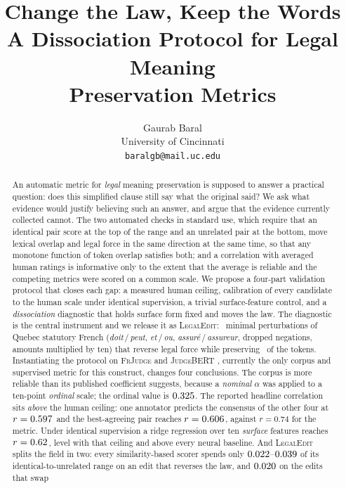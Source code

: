 \documentclass[11pt]{article}
\title{\textbf{Change the Law, Keep the Words}\\[2pt]
\large A Dissociation Protocol for Legal Meaning\\
Preservation Metrics}
\author{Gaurab Baral\\[2pt]
\normalsize University of Cincinnati\\[1pt]
\normalsize \texttt{baralgb@mail.uc.edu}}
\date{}
\begin{document}
\maketitle

\begin{abstract}
\noindent
An automatic metric for \emph{legal} meaning preservation is supposed to answer
a practical question: does this simplified clause still say what the original
said? We ask what evidence would justify believing such an answer, and argue
that the evidence currently collected cannot. The two automated checks in
standard use, which require that an identical pair score at the top of the
range and an unrelated pair at the bottom, move lexical overlap and legal force
in the same direction at the same time, so that any monotone function of token
overlap satisfies both; and a correlation with averaged human ratings is
informative only to the extent that the average is reliable and the competing
metrics were scored on a common scale. We propose a four-part validation protocol that closes each
gap: a measured human ceiling, calibration of every candidate to the human scale
under identical supervision, a trivial surface-feature control, and a
\emph{dissociation} diagnostic that holds surface form fixed and moves the law.
The diagnostic is the central instrument and we release it as
\textsc{LegalEdit}: \numedits\ minimal perturbations of Quebec statutory French
(\emph{doit}\,/\,\emph{peut}, \emph{et}\,/\,\emph{ou},
\emph{assur\'e}\,/\,\emph{assureur}, dropped negations, amounts multiplied by
ten) that reverse legal force while preserving \meanjaccard\ of the tokens.
Instantiating the protocol on \textsc{FrJudge} and \textsc{JudgeBERT}
\citep{beauchemin2025judgebert}, currently the only corpus and supervised metric
for this construct, changes four conclusions. The corpus is more reliable than
its published coefficient suggests, because a \emph{nominal} $\alpha$ was
applied to a ten-point \emph{ordinal} scale; the ordinal value is $0.325$.
The reported headline correlation sits \emph{above} the human ceiling: one
annotator predicts the consensus of the other four at $r=0.597$ and the
best-agreeing pair reaches $r=0.606$, against $r=0.74$ for the metric.
Under identical supervision a ridge regression over ten \emph{surface} features
reaches $r=0.62$, level with that ceiling and above every neural baseline.
And \textsc{LegalEdit} splits the field in two: every similarity-based scorer
spends only $0.022$--$0.039$ of its identical-to-unrelated range on
an edit that reverses the law, and $0.020$ on the edits that swap

\end{abstract}
\end{document}
